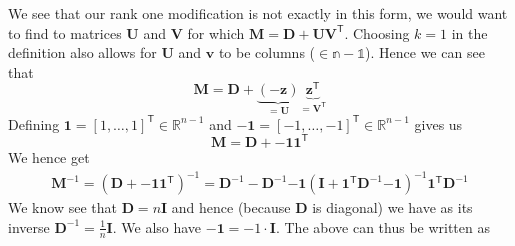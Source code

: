 \documentclass{article}
\begin{document}
\noindent We see that our rank one modification is not exactly in this form, we would want to find to matrices $\mathbf{U}$ and $\mathbf{V}$ for which $\mathbf{M} = \mathbf{D} + \mathbf{U}\mathbf{V}^{\mathsf{T}}$. Choosing $k = 1$ in the definition also allows for $\mathbf{U}$ and $\mathbf{v}$ to be columns ($\in \mathbb{n-1}$). Hence we can see that
\begin{equation}
     \mathbf{M} = \mathbf{D} + \underbrace{\left(-\mathbf{z}\right)}_{=\mathbf{U}}\underbrace{\mathbf{z}^{\mathsf{T}}}_{=\mathbf{V}^{\mathsf{T}}}
\end{equation}
Defining $\mathbf{1} = \left[1, \dots, 1\right]^{\mathsf{T}} \in \mathbb{R}^{n-1}$ and $\mathbf{-1} = \left[-1, \dots, -1\right]^{\mathsf{T}} \in \mathbb{R}^{n-1}$ gives us 
\begin{equation*}
    \mathbf{M} = \mathbf{D} + \mathbf{-1}\mathbf{1}^{\mathsf{T}}
\end{equation*}
We hence get
\begin{align*}
    \mathbf{M}^{-1} = \left(\mathbf{D} + \mathbf{-1}\mathbf{1}^{\mathsf{T}}\right)^{-1} = \mathbf{D}^{-1} - \mathbf{D}^{-1}\mathbf{-1}\left(\mathbf{I} + \mathbf{1}^{\mathsf{T}}\mathbf{D}^{-1}\mathbf{-1}\right)^{-1}\mathbf{1}^{\mathsf{T}}\mathbf{D}^{-1}
\end{align*}
We know see that $\mathbf{D}= n\mathbf{I}$ and hence (because $\mathbf{D}$ is diagonal) we have as its inverse $\mathbf{D}^{-1} = \frac{1}{n}\mathbf{I}$. We also have $\mathbf{-1} = -1 \cdot \mathbf{I}$. The above can thus be written as 
\end{document}
